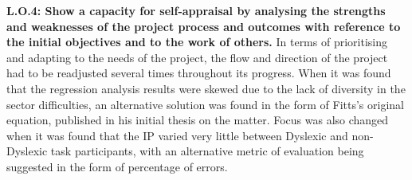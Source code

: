		\textbf{L.O.4: Show a capacity for self-appraisal by analysing the strengths and weaknesses of the project process and outcomes with reference to the initial objectives and to the work of others.}
		In terms of prioritising and adapting to the needs of the project, the flow and direction of the project had to be readjusted several times throughout its progress. When it was found that the regression analysis results were skewed due to the lack of diversity in the sector difficulties, an alternative solution was found in the form of Fitts’s original equation, published in his initial thesis on the matter.
		Focus was also changed when it was found that the IP varied very little between Dyslexic and non-Dyslexic task participants, with an alternative metric of evaluation being suggested in the form of percentage of errors.
		
\newpage